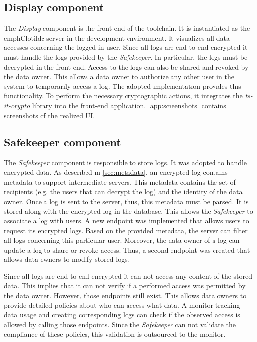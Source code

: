 \documentclass[../main.tex]{subfiles}
\begin{document}
\subsection{Display component}
The \emph{Display} component is the front-end of the toolchain.
It is instantiated as the emph{Clotilde} server in the development environment.
It visualizes all data accesses concerning the logged-in user.
Since all logs are end-to-end encrypted it must handle the logs provided by the \emph{Safekeeper}.
In particular, the logs must be decrypted in the front-end.
Access to the logs can also be shared and revoked by the data owner.
This allows a data owner to authorize any other user in the system to temporarily access a log.
The adopted implementation provides this functionality.
To perform the necessary cryptographic actions, it integrates the \emph{ts-it-crypto} library into the front-end application.
\cref{app:screenshots} contains screenshots of the realized UI.

\subsection{Safekeeper component}
\label{sec:implemenation-safekeeper}
The \emph{Safekeeper} component is responsible to store logs.
It was adopted to handle encrypted data.
As described in \cref{sec:metadata}, an encrypted log contains metadata to support intermediate servers.
This metadata contains the set of recipients (e.g. the users that can decrypt the log) and the identity of the data owner.
Once a log is sent to the server, thus, this metadata must be parsed.
It is stored along with the encrypted log in the database.
This allows the \emph{Safekeeper} to associate a log with users.
A new endpoint was implemented that allows users to request its encrypted logs.
Based on the provided metadata, the server can filter all logs concerning this particular user.
Moreover, the data owner of a log can update a log to share or revoke access.
Thus, a second endpoint was created that allows data owners to modify stored logs.

Since all logs are end-to-end encrypted it can not access any content of the stored data.
This implies that it can not verify if a performed access was permitted by the data owner.
However, those endpoints still exist.
This allows data owners to provide detailed policies about who can access what data.
A monitor tracking data usage and creating corresponding logs can check if the observed access is allowed by calling those endpoints.
Since the \emph{Safekeeper} can not validate the compliance of these policies, this validation is outsourced to the monitor.
\end{document}
